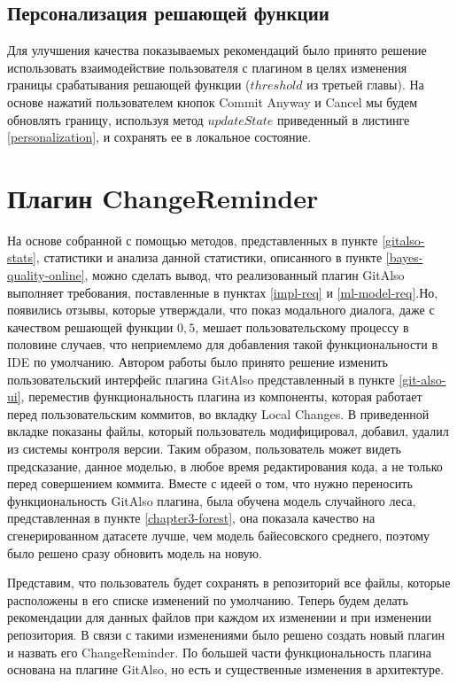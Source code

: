 \subsection{Персонализация решающей функции}
Для улучшения качества показываемых рекомендаций было принято решение использовать взаимодействие пользователя с плагином в целях изменения границы срабатывания решающей функции ($threshold$ из третьей главы). На основе нажатий пользователем кнопок Commit Anyway и Cancel мы будем обновлять границу, используя метод $updateState$ приведенный в листинге \ref{personalization}, и сохранять ее в локальное состояние.
\section{Плагин ChangeReminder}\label{changereminder-main}
На основе собранной с помощью методов, представленных в пункте \ref{gitalso-stats}, статистики и анализа данной статистики, описанного в пункте \ref{bayes-quality-online}, можно сделать вывод, что реализованный плагин GitAlso выполняет требования, поставленные в пунктах \ref{impl-req} и \ref{ml-model-req}.Но, появились отзывы, которые утверждали, что показ модального диалога, даже с качеством решающей функции $0,5$, мешает пользовательскому процессу в половине случаев, что неприемлемо для добавления такой функциональности в IDE по умолчанию. Автором работы было принято решение изменить пользовательский интерфейс плагина GitAlso представленный в пункте \ref{git-also-ui}, переместив функциональность плагина из компоненты, которая работает перед пользовательским коммитов, во вкладку Local Changes. В приведенной вкладке показаны файлы, который пользователь модифицировал, добавил, удалил из системы контроля версии. Таким образом, пользователь может видеть предсказание, данное моделью, в любое время редактирования кода, а не только перед совершением коммита. Вместе с идеей о том, что нужно переносить функциональность GitAlso плагина, была обучена модель случайного леса, представленная в пункте \ref{chapter3-forest}, она показала качество на сгенерированном датасете лучше, чем модель байесовского среднего, поэтому было решено сразу обновить модель на новую.

Представим, что пользователь будет сохранять в репозиторий все файлы, которые расположены в его списке изменений по умолчанию. Теперь будем делать рекомендации для данных файлов при каждом их изменении и при изменении репозитория. В связи с такими изменениями было решено создать новый плагин и назвать его ChangeReminder. По большей части функциональность плагина основана на плагине GitAlso, но есть и существенные изменения в архитектуре.
